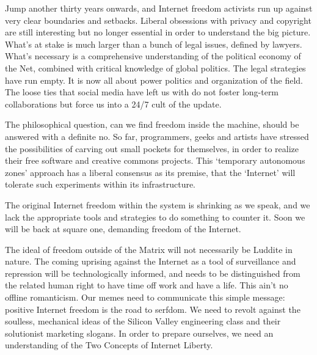 Jump another thirty years onwards, and Internet freedom activists run up
against very clear boundaries and setbacks. Liberal obsessions with
privacy and copyright are still interesting but no longer essential in
order to understand the big picture. What's at stake is much larger than
a bunch of legal issues, defined by lawyers. What's necessary is a
comprehensive understanding of the political economy of the Net,
combined with critical knowledge of global politics. The legal
strategies have run empty. It is now all about power politics and
organization of the field. The loose ties that social media have left us
with do not foster long-term collaborations but force us into a 24/7
cult of the update.

The philosophical question, can we find freedom inside the machine,
should be answered with a definite no. So far, programmers, geeks and
artists have stressed the possibilities of carving out small pockets for
themselves, in order to realize their free software and creative commons
projects. This `temporary autonomous zones' approach has a liberal
consensus as its premise, that the `Internet' will tolerate such
experiments within its infrastructure.

The original Internet freedom within the system is shrinking as we
speak, and we lack the appropriate tools and strategies to do something
to counter it. Soon we will be back at square one, demanding freedom of
the Internet.

The ideal of freedom outside of the Matrix will not necessarily be
Luddite in nature. The coming uprising against the Internet as a tool of
surveillance and repression will be technologically informed, and needs
to be distinguished from the related human right to have time off work
and have a life. This ain't no offline romanticism. Our memes need to
communicate this simple message: positive Internet freedom is the road
to serfdom. We need to revolt against the soulless, mechanical ideas of
the Silicon Valley engineering class and their solutionist marketing
slogans. In order to prepare ourselves, we need an understanding of the
Two Concepts of Internet Liberty.
